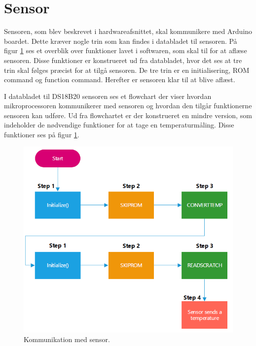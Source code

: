 \newpage
\section{Sensor}
Sensoren, som blev beskrevet i hardwareafsnittet, skal kommunikere med Arduino boardet. Dette kræver nogle trin som kan findes i databladet til sensoren. På figur \ref{sensor_min} ses et overblik over funktioner lavet i softwaren, som skal til for at aflæse sensoren. Disse funktioner er konstrueret ud fra databladet, hvor det ses at tre trin skal følges præcist for at tilgå sensoren. De tre trin er en initialisering, ROM command og function command. Herefter er sensoren klar til at blive aflæst.



I databladet til DS18B20 sensoren ses et flowchart der viser hvordan mikroprocessoren kommunikerer med sensoren og hvordan den tilgår funktionerne  sensoren kan udføre. Ud fra flowchartet er der konstrueret en mindre version, som indeholder de nødvendige funktioner for at tage en temperaturmåling. Disse funktioner ses på figur \ref{sensor_min}.



\begin{figure}[h!]
  \centering
  \includegraphics[width=1\textwidth]{figures/sensor_minimum.png}
  \caption{Kommunikation med sensor.}
  \label{sensor_min}
\end{figure}

\newpage
